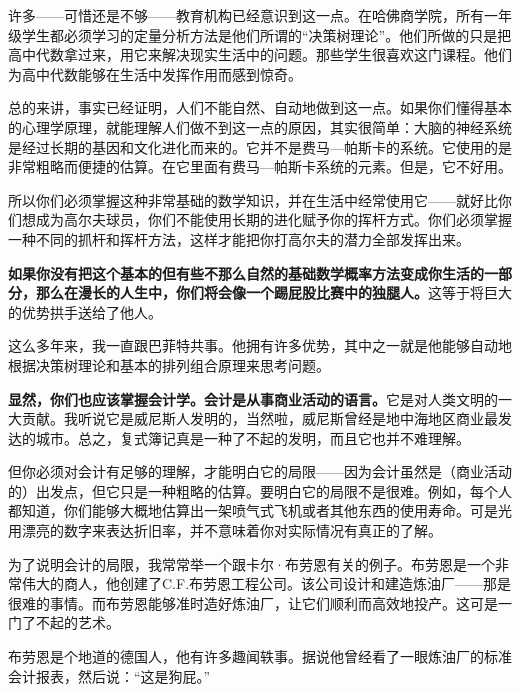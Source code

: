 许多——可惜还是不够——教育机构已经意识到这一点。在哈佛商学院，所有一年级学生都必须学习的定量分析方法是他们所谓的“决策树理论”。他们所做的只是把高中代数拿过来，用它来解决现实生活中的问题。那些学生很喜欢这门课程。他们为高中代数能够在生活中发挥作用而感到惊奇。
\par

总的来讲，事实已经证明，人们不能自然、自动地做到这一点。如果你们懂得基本的心理学原理，就能理解人们做不到这一点的原因，其实很简单：大脑的神经系统是经过长期的基因和文化进化而来的。它并不是费马—帕斯卡的系统。它使用的是非常粗略而便捷的估算。在它里面有费马—帕斯卡系统的元素。但是，它不好用。
\par

所以你们必须掌握这种非常基础的数学知识，并在生活中经常使用它——就好比你们想成为高尔夫球员，你们不能使用长期的进化赋予你的挥杆方式。你们必须掌握一种不同的抓杆和挥杆方法，这样才能把你打高尔夫的潜力全部发挥出来。
\par

\textbf{如果你没有把这个基本的但有些不那么自然的基础数学概率方法变成你生活的一部分，那么在漫长的人生中，你们将会像一个踢屁股比赛中的独腿人。}这等于将巨大的优势拱手送给了他人。
\par

这么多年来，我一直跟巴菲特共事。他拥有许多优势，其中之一就是他能够自动地根据决策树理论和基本的排列组合原理来思考问题。
\par

\textbf{显然，你们也应该掌握会计学。会计是从事商业活动的语言。}它是对人类文明的一大贡献。我听说它是威尼斯人发明的，当然啦，威尼斯曾经是地中海地区商业最发达的城市。总之，复式簿记真是一种了不起的发明，而且它也并不难理解。
\par

但你必须对会计有足够的理解，才能明白它的局限——因为会计虽然是（商业活动的）出发点，但它只是一种粗略的估算。要明白它的局限不是很难。例如，每个人都知道，你们能够大概地估算出一架喷气式飞机或者其他东西的使用寿命。可是光用漂亮的数字来表达折旧率，并不意味着你对实际情况有真正的了解。
\par

为了说明会计的局限，我常常举一个跟卡尔·布劳恩有关的例子。布劳恩是一个非常伟大的商人，他创建了C.F.布劳恩工程公司。该公司设计和建造炼油厂——那是很难的事情。而布劳恩能够准时造好炼油厂，让它们顺利而高效地投产。这可是一门了不起的艺术。
\par

布劳恩是个地道的德国人，他有许多趣闻轶事。据说他曾经看了一眼炼油厂的标准会计报表，然后说：“这是狗屁。”
\par

